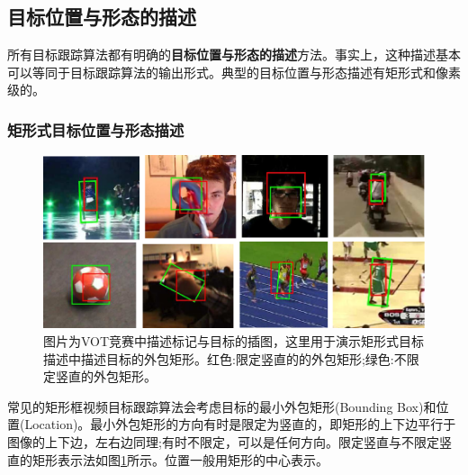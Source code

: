 \subsection{目标位置与形态的描述} 
所有目标跟踪算法都有明确的\textbf{目标位置与形态的描述}方法。事实上，这种描述基本可以等同于目标跟踪算法的输出形式。典型的目标位置与形态描述有矩形式和像素级的。
\par
\subsubsection{矩形式目标位置与形态描述}
\par
\begin{figure}[htbp!]
    \centering
    \includegraphics[width = 1.\textwidth]{chap/img/overlap_examples.pdf}
    \caption{图片为VOT竞赛中描述标记与目标的插图\supercite{VOT_TPAMI}，这里用于演示矩形式目标描述中描述目标的外包矩形。红色:限定竖直的的外包矩形;绿色:不限定竖直的外包矩形。}
    \label{fig:bunding_boxes}
\end{figure}
\par
常见的矩形框视频目标跟踪算法会考虑目标的最小外包矩形(Bounding Box)和位置(Location)。最小外包矩形的方向有时是限定为竖直的，即矩形的上下边平行于图像的上下边，左右边同理;有时不限定，可以是任何方向。限定竖直与不限定竖直的矩形表示法如图\ref{fig:bunding_boxes}所示。位置一般用矩形的中心表示。
\par
